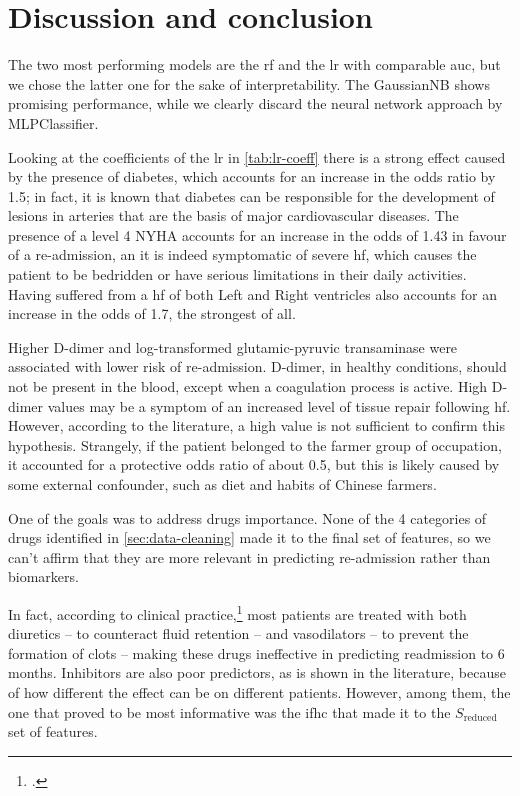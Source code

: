 \section{Discussion and conclusion}

The two most performing models are the \gls{rf} and the \gls{lr} with comparable \gls{auc}, but we chose the latter one for the sake of interpretability. The GaussianNB shows promising performance, while we clearly discard the neural network approach by MLPClassifier.

Looking at the coefficients of the \gls{lr} in \autoref{tab:lr-coeff} there is a strong effect caused by the presence of diabetes, which accounts for an increase in the odds ratio by 1.5; in fact, it is known that diabetes can be responsible for the development of lesions in arteries that are the basis of major cardiovascular diseases.
The presence of a level 4 NYHA accounts for an increase in the odds of 1.43 in favour of a re-admission, an it is indeed symptomatic of severe \gls{hf}, which causes the patient to be bedridden or have serious limitations in their daily activities.
Having suffered from a \gls{hf} of both Left and Right ventricles also accounts for an increase in the odds of 1.7, the strongest of all.

Higher D-dimer and log-transformed glutamic-pyruvic transaminase were associated with lower risk of re-admission.
D-dimer, in healthy conditions, should not be present in the blood, except when a coagulation process is active. High D-dimer values may be a symptom of an increased level of tissue repair following \gls{hf}. However, according to the literature, a high value is not sufficient to confirm this hypothesis.
Strangely, if the patient belonged to the farmer group of occupation, it accounted for a protective odds ratio of about 0.5, but this is likely caused by some external confounder, such as diet and habits of Chinese farmers.

One of the goals was to address drugs importance. None of the 4 categories of drugs identified in \autoref{sec:data-cleaning} made it to the final set of features, so we can't affirm that they are more relevant in predicting re-admission rather than biomarkers.

In fact, according to clinical practice,\footcite{Lonn2000Regular} most patients are treated with both diuretics -- to counteract fluid retention -- and vasodilators -- to prevent the formation of clots -- making these drugs ineffective in predicting readmission to 6 months.
Inhibitors are also poor predictors, as is shown in the literature, because of how different the effect can be on different patients.
However, among them, the one that proved to be most informative was the \gls{ifhc} that made it to the $S_{\text{reduced}}$ set of features.

